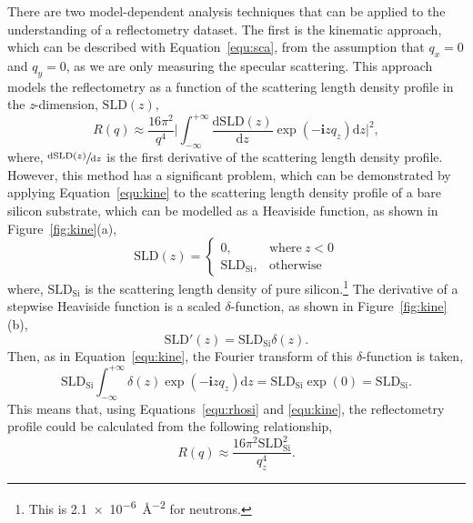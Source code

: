 There are two model-dependent analysis techniques that can be applied to the understanding of a reflectometry dataset.
The first is the kinematic approach, which can be described with Equation~\ref{equ:sca}, from the assumption that $q_x = 0$ and $q_y = 0$, as we are only measuring the specular scattering.
This approach models the reflectometry as a function of the scattering length density profile in the \emph{z}-dimension, $\text{SLD}(z)$,
%
\begin{equation}
    R(q) \approx \frac{16\pi^2}{q^4}\bigg|\int_{-\infty}^{+\infty}\frac{\text{d}\text{SLD}(z)}{\text{d}z}\exp{(-\mathbf{i}zq_z)}\text{d}z\bigg|^2,
    \label{kine}
\end{equation}
%
where, $\sfrac{\text{d}\text{SLD}(z)}{\text{d}z}$ is the first derivative of the scattering length density profile.
However, this method has a significant problem, which can be demonstrated by applying Equation~\ref{equ:kine} to the scattering length density profile of a bare silicon substrate, which can be modelled as a Heaviside function, as shown in Figure~\ref{fig:kine}(a),
%
\begin{equation}
    \text{SLD}(z) =
  \begin{cases}
    0, & \text{where}\ z < 0 \\
    \text{SLD}_{\text{Si}}, & \text{otherwise}
  \end{cases}
\end{equation}
%
where, $\text{SLD}_{\text{Si}}$ is the scattering length density of pure silicon.\footnote{This is \SI{2.1e-6}{\angstrom^{-2}} for neutrons.}
The derivative of a stepwise Heaviside function is a scaled $\delta$-function, as shown in Figure~\ref{fig:kine}(b),
%
\begin{equation}
    \text{SLD}'(z) = \text{SLD}_{\text{Si}}\delta(z).
\end{equation}
%
Then, as in Equation~\ref{equ:kine}, the Fourier transform of this $\delta$-function is taken,
%
\begin{equation}
    \text{SLD}_{\text{Si}}\int_{-\infty}^{+\infty}\delta(z)\exp{(-\mathbf{i}zq_z)}\text{d}z = \text{SLD}_{\text{Si}}\exp(0) = \text{SLD}_{\text{Si}}.
    \label{equ:rhosi}
\end{equation}
%
This means that, using Equations~\ref{equ:rhosi} and \ref{equ:kine}, the reflectometry profile could be calculated from the following relationship,
%
\begin{equation}
    R(q)\approx \frac{16\pi^2\text{SLD}_{\text{Si}}^2}{q_z^4}.
\end{equation}
